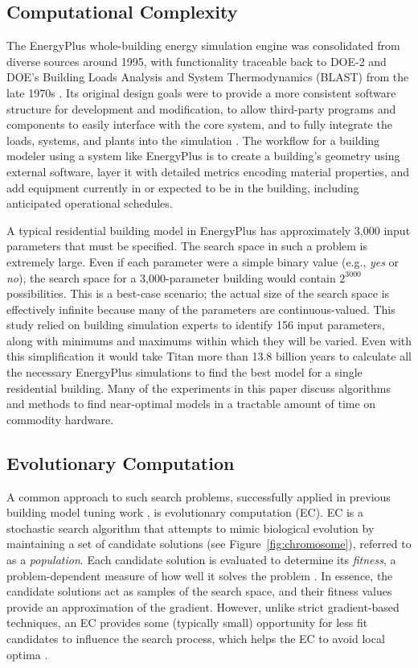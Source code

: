 \documentclass[preprint, review, 12pt]{elsarticle}
\begin{document}
\subsection{Computational Complexity}
The EnergyPlus whole-building energy simulation engine was consolidated from diverse sources around 1995, with functionality traceable back to DOE-2 and DOE's Building Loads Analysis and System Thermodynamics (BLAST) from the late 1970s \cite{cit:energyplus}. Its original design goals were to provide a more consistent software structure for development and modification, to allow third-party programs and components to easily interface with the core system, and to fully integrate the loads, systems, and plants into the simulation \cite{cit:energyplus}. The workflow for a building modeler using a system like EnergyPlus is to create a building's geometry using external software, layer it with detailed metrics encoding material properties, and add equipment currently in or expected to be in the building, including anticipated operational schedules.

A typical residential building model in EnergyPlus has approximately 3,000 input parameters that must be specified. The search space in such a problem is extremely large. Even if each parameter were a simple binary value (e.g., \emph{yes} or \emph{no}), the search space for a 3,000-parameter building would contain $2^{3000}$ possibilities. This is a best-case scenario; the actual size of the search space is effectively infinite because many of the parameters are continuous-valued. This study relied on building simulation experts to identify 156 input parameters, along with minimums and maximums within which they will be varied. Even with this simplification it would take Titan more than 13.8 billion years to calculate all the necessary EnergyPlus simulations to find the best model for a single residential building. Many of the experiments in this paper discuss algorithms and methods to find near-optimal models in a tractable amount of time on commodity hardware.

\subsection{Evolutionary Computation}
A common approach to such search problems, successfully applied in previous building model tuning work \cite{cit:garrett2013}, is evolutionary computation (EC). EC \cite{cit:dejong1993,cit:spears1993,cit:fogel1994,cit:fogel2000} is a stochastic search algorithm that attempts to mimic biological evolution by maintaining a set of candidate solutions (see Figure~\ref{fig:chromosome}), referred to as a \emph{population}. Each candidate solution is evaluated to determine its \emph{fitness}, a problem-dependent measure of how well it solves the problem \cite{cit:dejong2006}. In essence, the candidate solutions act as samples of the search space, and their fitness values provide an approximation of the gradient. However, unlike strict gradient-based techniques, an EC provides some (typically small) opportunity for less fit candidates to influence the search process, which helps the EC to avoid local optima \cite{cit:michalewicz2004}. 
\end{document}
